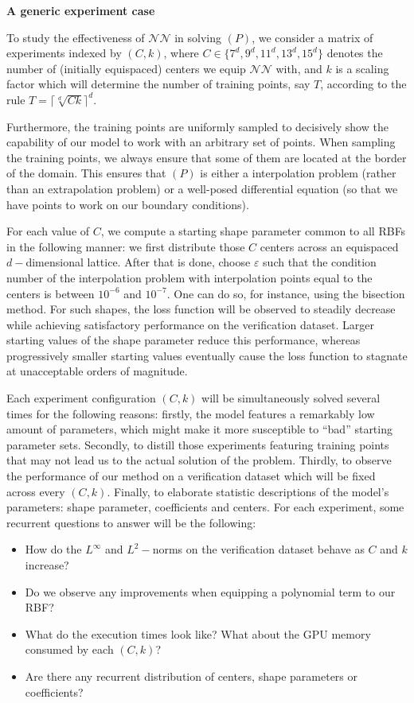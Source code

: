 \documentclass[12pt]{report} %
\begin{document}
\textbf{A generic experiment case}

To study the effectiveness of $\mathcal{NN}$ in solving $(P)$, we consider a matrix of experiments indexed by $(C,k)$, where $C \in \{7^d,9^d,11^d,13^d,15^d\}$ denotes the number of (initially equispaced) centers we equip $\mathcal{NN}$ with, and $k$ is a scaling factor which will determine the number of training points, say $T$, according to the rule
$T = \lceil \sqrt[d]{C  k} \rceil ^d $. 

Furthermore, the training points are uniformly sampled to decisively show the capability of our model to work with an arbitrary set of points. When sampling the training points, we always ensure that some of them are located at the border of the domain. This ensures that $(P)$ is either a interpolation problem (rather than an extrapolation problem) or a well-posed differential equation (so that we have points to work on our boundary conditions).

For each value of $C$, we compute a starting shape parameter common to all RBFs in the following manner: we first distribute those $C$ centers across an equispaced $d-$dimensional lattice. After that is done, choose $\varepsilon$ such that the condition number of the interpolation problem with interpolation points equal to the centers is between $10^{-6}$ and $10^{-7}$. One can do so, for instance, using the bisection method. For such shapes, the loss function will be observed to steadily decrease while achieving satisfactory performance on the verification dataset. Larger starting values of the shape parameter reduce this performance, whereas progressively smaller starting values eventually cause the loss function to stagnate at unacceptable orders of magnitude.

Each experiment configuration $(C,k)$ will be simultaneously solved several times for the following reasons: firstly, the model features a remarkably low amount of parameters, which might make it more susceptible to ``bad'' starting parameter sets. Secondly, to distill those experiments featuring training points that may not lead us to the actual solution of the problem. Thirdly, to observe the performance of our method on a verification dataset which will be fixed across every $(C,k)$. Finally, to elaborate statistic descriptions of the model's parameters: shape parameter, coefficients and centers. For each experiment, some recurrent questions to answer will be the following:

\begin{itemize}
  \item How do the $L^\infty$ and $L^2-$norms on the verification dataset behave as $C$ and $k$ increase?
  \item Do we observe any improvements when equipping a polynomial term to our RBF?
  \item What do the execution times look like? What about the GPU memory consumed by each $(C,k)$?
  \item Are there any recurrent distribution of centers, shape parameters or coefficients?
\end{itemize}
\end{document}
